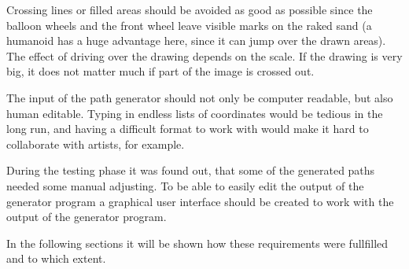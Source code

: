 Crossing lines or filled areas should be avoided as good as possible since the balloon wheels and the front wheel leave visible marks on the raked sand (a humanoid has a huge advantage here, since it can jump over the drawn areas). The effect of driving over the drawing depends on the scale. If the drawing is very big, it does not matter much if part of the image is crossed out. 

The input of the path generator should not only be computer readable, but also human editable. Typing in endless lists of coordinates would be tedious in the long run, and having a difficult format to work with would make it hard to collaborate with artists, for example. 

During the testing phase it was found out, that some of the generated paths needed some manual adjusting. To be able to easily edit the output of the generator program a graphical user interface should be created to work with the output of the generator program. 

In the following sections it will be shown how these requirements were fullfilled and to which extent.